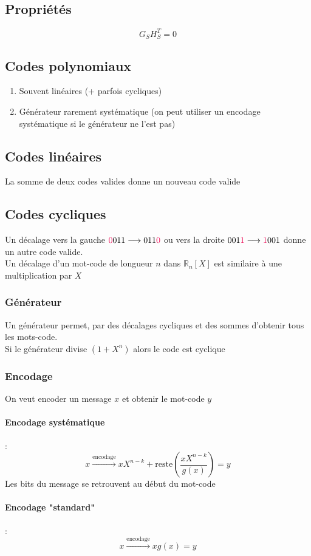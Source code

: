 \documentclass[resume.tex]{subfiles}
\begin{document}
\subsection{Propriétés}
$$G_SH_S^T=0$$
\subsection{Codes polynomiaux}
\begin{enumerate}
\item Souvent linéaires (+ parfois cycliques)
\item Générateur rarement systématique (on peut utiliser un encodage systématique si le générateur ne l'est pas)
\end{enumerate}
\subsection{Codes linéaires}
La somme de deux codes valides donne un nouveau code valide
\subsection{Codes cycliques}
Un décalage vers la gauche $\textcolor{OrangeRed}{0}011\longrightarrow 011\textcolor{OrangeRed}{0}$ ou vers la droite $001\textcolor{OrangeRed}{1}\longrightarrow \textcolor{OrangeRed}{1}001$ donne un autre code valide.\\
Un décalage d'un mot-code de longueur $n$ dans $\mathbb{R}_n[X]$ est similaire à une multiplication par $X$
\subsubsection{Générateur}
Un générateur permet, par des décalages cycliques et des sommes d'obtenir tous les mots-code.\\
Si le générateur divise $(1+X^n)$ alors le code est cyclique
\subsubsection{Encodage}
On veut encoder un message $x$ et obtenir le mot-code $y$
\paragraph{Encodage systématique} :
$$x\xrightarrow{\text{encodage}} xX^{n-k}+\text{reste}\left(\frac{xX^{n-k}}{g(x)}\right)=y$$
Les bits du message se retrouvent au début du mot-code
\paragraph{Encodage "standard"} :
$$x\xrightarrow{\text{encodage}} xg(x)=y$$
\end{document}
